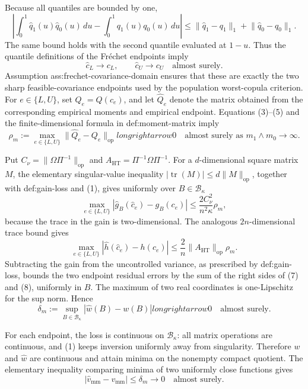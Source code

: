 Because all quantiles are bounded by one,
\[
 \left|
  \int_0^1\widehat q_1(u)\widehat q_0(u)\,du
  -\int_0^1q_1(u)q_0(u)\,du
 \right|
 \le
 \lVert\widehat q_1-q_1\rVert_1
 +\lVert\widehat q_0-q_0\rVert_1.
 \tag{4}
\]
The same bound holds with the second quantile evaluated at \(1-u\).  Thus the quantile definitions of the Fr\'echet endpoints imply
\[
 \widehat c_L\longrightarrow c_L,
 \qquad
 \widehat c_U\longrightarrow c_U
 \quad\text{almost surely}.
 \tag{5}
\]
Assumption ass:frechet-covariance-domain ensures that these are exactly the two sharp feasible-covariance endpoints used by the population worst-copula criterion.  For \(e\in\{L,U\}\), set \(Q_e=Q(c_e)\), and let \(\widehat Q_e\) denote the matrix obtained from the corresponding empirical moments and empirical endpoint.  Equations (3)--(5) and the finite-dimensional formula in def:moment-matrix imply
\[
 \rho_m:=\max_{e\in\{L,U\}}
 \lVert\widehat Q_e-Q_e\rVert_{\mathrm{op}}longrightarrow0
 \quad\text{almost surely as }m_1\wedge m_0\to\infty.
 \tag{6}
\]

Put \(C_\nu=\lVert\Omega\Pi^{-1}\rVert_{\mathrm{op}}\) and \(A_{\mathrm{HT}}=\Pi^{-1}\Omega\Pi^{-1}\).  For a \(d\)-dimensional square matrix \(M\), the elementary singular-value inequality \(|\operatorname{tr}(M)|\le d\lVert M\rVert_{\mathrm{op}}\), together with def:gain-loss and (1), gives uniformly over \(B\in\mathcal B_\kappa\)
\[
 \max_{e\in\{L,U\}}
 |\widehat g_B(\widehat c_e)-g_B(c_e)|
 \le \frac{2C_\nu^2}{n^2\kappa}\rho_m,
 \tag{7}
\]
because the trace in the gain is two-dimensional.  The analogous \(2n\)-dimensional trace bound gives
\[
 \max_{e\in\{L,U\}}
 |\widehat h(\widehat c_e)-h(c_e)|
 \le \frac{2}{n}\lVert A_{\mathrm{HT}}\rVert_{\mathrm{op}}\rho_m.
 \tag{8}
\]
Subtracting the gain from the uncontrolled variance, as prescribed by def:gain-loss, bounds the two endpoint residual errors by the sum of the right sides of (7) and (8), uniformly in \(B\).  The maximum of two real coordinates is one-Lipschitz for the sup norm.  Hence
\[
 \delta_m:=\sup_{B\in\mathcal B_\kappa}
 |\widehat w(B)-w(B)|longrightarrow0
 \quad\text{almost surely}.
 \tag{9}
\]

For each endpoint, the loss is continuous on \(\mathcal B_\kappa\): all matrix operations are continuous, and (1) keeps inversion uniformly away from singularity.  Therefore \(w\) and \(\widehat w\) are continuous and attain minima on the nonempty compact quotient.  The elementary inequality comparing minima of two uniformly close functions gives
\[
 |\widehat v_{\mathrm{mm}}-v_{\mathrm{mm}}|
 \le\delta_m\longrightarrow0
 \quad\text{almost surely}.
 \tag{10}
\]

